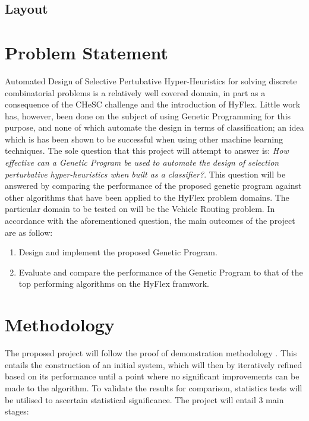 \documentclass[a4paper,12pt]{article}
\begin{document}
    \subsection{Layout}
    \par{
            
        }
\section{Problem Statement}
    \par{Automated Design of Selective Pertubative Hyper-Heuristics for solving discrete combinatorial problems is a relatively well covered domain, in part as a consequence of the CHeSC challenge and the introduction of HyFlex. Little work has, however, been done on the subject of using Genetic Programming for this purpose, and none of which automate the design in terms of classification; an idea which is has been shown to be successful when using other machine learning techniques. \newline 
    \newline
    The sole question that this project will attempt to answer is: \textit{How effective can a Genetic Program be used to automate the design of selection perturbative hyper-heuristics when built as a classifier?}. This question will be answered by comparing the performance of the proposed genetic program against other algorithms that have been applied to the HyFlex problem domains. The particular domain to be tested on will be the Vehicle Routing problem.\newline
    \newline
    In accordance with the aforementioned question, the main outcomes of the project are as follow:\newline
        \begin{enumerate}
            \item Design and implement the proposed Genetic Program.
            \item Evaluate and compare the performance of the Genetic Program to that of the top performing algorithms on the HyFlex framwork.
        \end{enumerate}
    }

\section{Methodology} 
    \par{The proposed project will follow the proof of demonstration methodology \cite{johnsonc}. This entails the construction of an initial system, which will then by iteratively refined based on its performance until a point where no significant improvements can be made to the algorithm. To validate the results for comparison, statistics tests will be utilised to ascertain statistical significance.\newline
    \newline
    The project will entail 3 main stages:}
\end{document}
